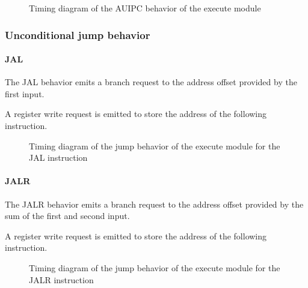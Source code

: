       \begin{figure}[H]
          \centering
          
          \caption{Timing diagram of the AUIPC behavior of the execute module}
          \label{fig:exm-behavior-auipc}
        \end{figure}

    \subsubsection{Unconditional jump behavior}

      \paragraph{JAL}

      \begin{content}
          The JAL behavior emits a branch request to the address offset provided by the first input.
          
          A register write request is emitted to store the address of the following instruction.
        \end{content}

      \begin{figure}[H]
          \centering
          
          \caption{Timing diagram of the jump behavior of the execute module for the JAL instruction}
          \label{fig:exm-behavior-jump-jal}
        \end{figure}

      \paragraph{JALR}

      \begin{content}
          The JALR behavior emits a branch request to the address offset provided by the sum of the first and second input.
          
          A register write request is emitted to store the address of the following instruction.
        \end{content}

      \begin{figure}[H]
          \centering
          
          \caption{Timing diagram of the jump behavior of the execute module for the JALR instruction}
          \label{fig:exm-behavior-jump-jalr}
        \end{figure}

